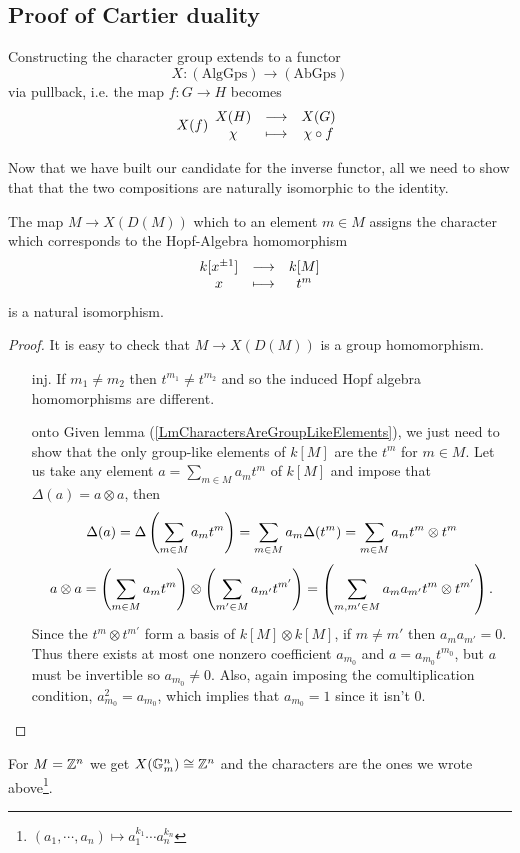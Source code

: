 \subsection{Proof of Cartier duality}

\begin{remark}
Constructing the character group extends to a functor
\[X:(\text{AlgGps})\to (\text{AbGps})\]
via pullback, i.e. the map $f:G\to H$ becomes
\[X(f)\begin{array}{ccc} {X(H)} & \longrightarrow & {X(G)}\\ {\chi} & \longmapsto & {\chi\circ f} \end{array}\]
\end{remark}


Now that we have built our candidate for the inverse functor, all we need to show that that the two compositions are naturally isomorphic to the identity.


\begin{proposition}
The map $M\to X(D(M))$ which to an element $m\in M$ assigns the character which corresponds to the Hopf-Algebra homomorphism
\[\begin{array}{ccc} {k[x^{\pm1}]} & \longrightarrow & {k[M]}\\ {x} & \longmapsto & {t^m} \end{array}\]
is a natural isomorphism.
\end{proposition}

\begin{proof}
It is easy to check that $M\to X(D(M))$ is a group homomorphism.
\setlength{\leftmargini}{0cm}
\begin{itemize}
\item[$\boxed{\text{inj.}}$] If $m_1\neq m_2$ then $t^{m_1}\neq t^{m_2}$ and so the induced Hopf algebra homomorphisms are different. 
\item[$\boxed{\text{onto}}$] Given lemma (\ref{LmCharactersAreGroupLikeElements}), we just need to show that the only group-like elements of $k[M]$ are the $t^m$ for $m\in M$. Let us take any element $a=\sum_{m\in M}a_mt^m$ of $k[M]$ and impose that $\Delta(a)=a\otimes a$, then
\[\Delta(a)=\Delta\left({\sum_{m\in M}a_mt^m}\right)=\sum_{m\in M}a_m\Delta(t^m)=\sum_{m\in M}a_m t^m\otimes t^m\]
\[a\otimes a=\left({\sum_{m\in M}a_mt^m}\right)\otimes \left({\sum_{m'\in M}a_{m'}t^{m'}}\right)=\left({\sum_{m,m'\in M}a_ma_{m'}t^m\otimes t^{m'}}\right).\]
Since the $t^m\otimes t^{m'}$ form a basis of $k[M]\otimes k[M]$, if $m\neq m'$ then $a_ma_{m'}=0$. Thus there exists at most one nonzero coefficient $a_{m_0}$ and $a=a_{m_0}t^{m_0}$, but $a$ must be invertible so $a_{m_0}\neq 0$. Also, again imposing the comultiplication condition, $a_{m_0}^2=a_{m_0}$, which implies that $a_{m_0}=1$ since it isn't $0$.
\end{itemize}
\setlength{\leftmargini}{0.5cm}
\end{proof}

\begin{corollary}
For $M=\mathbb{Z}^n$ we get $X(\mathbb{G}_m^n)\cong \mathbb{Z}^n$ and the characters are the ones we wrote above\footnote{$(a_1,\cdots, a_n)\mapsto a_1^{k_1}\cdots a_n^{k_n}$}.
\end{corollary}


